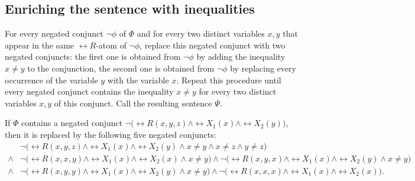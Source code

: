 \documentclass{lmcs}
\begin{document}
\subsection*{Enriching the sentence with inequalities} 
For every negated conjunct $\neg\phi$ of  $\Phi$ and for every two distinct variables $x,y$ that appear in the same $\rel{R}$-atom of $\neg\phi$,  replace this negated conjunct with two negated conjuncts: the first one is obtained from $\neg\phi$ by adding the inequality $x\not=y$ to the conjunction, the second one is obtained from $\neg\phi$ by replacing every occurrence of the variable $y$ with the variable $x$.
%
Repeat this procedure until every negated conjunct contains the inequality $x\not=y$ for every two distinct variables $x,y$ of this conjunct. Call the resulting sentence $\Psi$.

\begin{exa} \label{example:enriching_inequalities}
If $\Phi$ contains a negated conjunct $\neg\bigl(\rel{R}(x,y,z)\wedge\rel{X}_1(x)\wedge\rel{X}_2(y)\bigr)$, then it is replaced by the following five negated conjuncts: 
\begin{align*}
&\neg\bigl(\rel{R}(x,y,z)\wedge\rel{X}_1(x)\wedge\rel{X}_2(y)\wedge x\not=y \wedge x\not=z\wedge y\not=z\bigr)\\
\wedge &\neg\bigl(\rel{R}(x,x,y)\wedge\rel{X}_1(x)\wedge\rel{X}_2(x)\wedge x\not=y\bigr)\wedge \neg\bigl(\rel{R}(x,y,x)\wedge\rel{X}_1(x)\wedge\rel{X}_2(y)\wedge x\not=y\bigr)\\
\wedge &\neg\bigl(\rel{R}(x,y,y)\wedge\rel{X}_1(x)\wedge\rel{X}_2(y)\wedge x\not=y\bigr)\wedge \neg\bigl(\rel{R}(x,x,x)\wedge\rel{X}_1(x)\wedge\rel{X}_2(x)\bigr).
\end{align*}
\end{exa}
\end{document}
